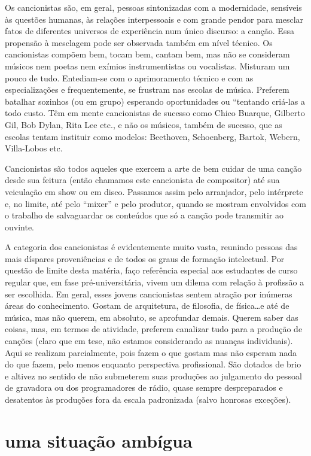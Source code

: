 Os cancionistas são, em geral, pessoas sintonizadas com a modernidade,
sensíveis às questões humanas, às relações interpessoais e com grande
pendor para mesclar fatos de diferentes universos de experiência num
único discurso: a canção. Essa propensão à mesclagem pode ser observada
também em nível técnico. Os cancionistas compõem bem, tocam bem, cantam
bem, mas não se consideram músicos nem poetas nem exímios
instrumentistas ou vocalistas. Misturam um pouco de tudo. Entediam-se
com o aprimoramento técnico e com as especializações e frequentemente,
se frustram nas escolas de música. Preferem batalhar sozinhos (ou em
grupo) esperando oportunidades ou ``tentando criá-las a todo custo. Têm
em mente cancionistas de sucesso como Chico Buarque, Gilberto Gil, Bob
Dylan, Rita Lee etc., e não os músicos, também de sucesso, que as
escolas tentam instituir como modelos: Beethoven, Schoenberg, Bartok,
Webern, Villa-Lobos etc.

Cancionistas são todos aqueles que exercem a arte de bem cuidar de uma
canção desde sua feitura (então chamamos este cancionista de compositor)
até sua veiculação em show ou em disco. Passamos assim pelo arranjador,
pelo intérprete e, no limite, até pelo ``mixer'' e pelo produtor, quando
se mostram envolvidos com o trabalho de salvaguardar os conteúdos que só
a canção pode transmitir ao ouvinte.

A categoria dos cancionistas é evidentemente muito vasta, reunindo
pessoas das mais díspares proveniências e de todos os graus de formação
intelectual. Por questão de limite desta matéria, faço referência
especial aos estudantes de curso regular que, em fase pré-universitária,
vivem um dilema com relação à profissão a ser escolhida. Em geral, esses
jovens cancionistas sentem atração por inúmeras áreas do conhecimento.
Gostam de arquitetura, de filosofia, de física\ldots e até de música, mas
não querem, em absoluto, se aprofundar demais. Querem saber das coisas,
mas, em termos de atividade, preferem canalizar tudo para a produção de
canções (claro que em tese, não estamos considerando as nuanças
individuais). Aqui se realizam parcialmente, pois fazem o que gostam mas
não esperam nada do que fazem, pelo menos enquanto perspectiva
profissional. São dotados de brio e altivez no sentido de não submeterem
suas produções ao julgamento do pessoal de gravadora ou dos
programadores de rádio, quase sempre despreparados e desatentos às
produções fora da escala padronizada (salvo honrosas exceções).

\section{uma situação ambígua}

